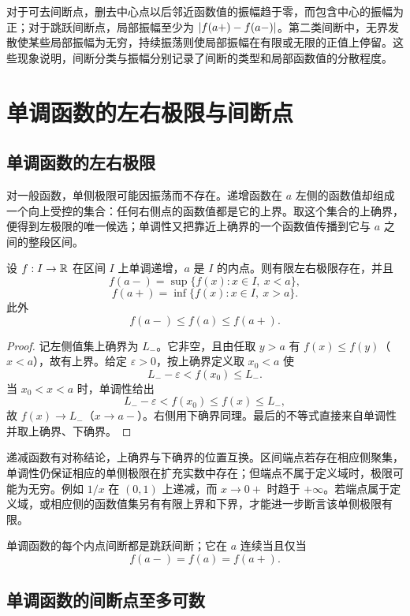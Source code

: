 对于可去间断点，删去中心点以后邻近函数值的振幅趋于零，而包含中心的振幅为正；对于跳跃间断点，局部振幅至少为
\(\left|f(a+)-f(a-)\right|\)。第二类间断中，无界发散使某些局部振幅为无穷，持续振荡则使局部振幅在有限或无限的正值上停留。这些现象说明，间断分类与振幅分别记录了间断的类型和局部函数值的分散程度。

\section{单调函数的左右极限与间断点}

\subsection{单调函数的左右极限}

对一般函数，单侧极限可能因振荡而不存在。递增函数在 \(a\) 左侧的函数值却组成一个向上受控的集合：任何右侧点的函数值都是它的上界。取这个集合的上确界，便得到左极限的唯一候选；单调性又把靠近上确界的一个函数值传播到它与 \(a\) 之间的整段区间。


\begin{theorem}[单调函数的单侧极限]
设 \(f:I\to\mathbb{R}\) 在区间 \(I\) 上单调递增，\(a\) 是 \(I\) 的内点。则有限左右极限存在，并且
\[
 f(a-)=\sup\{f(x):x\in I,\ x<a\},
\]
\[
 f(a+)=\inf\{f(x):x\in I,\ x>a\}.
\]
此外
\[
 f(a-)\le f(a)\le f(a+).
\]
\end{theorem}

\begin{proof}
记左侧值集上确界为 \(L_-\)。它非空，且由任取 \(y>a\) 有 \(f(x)\le f(y)\)（\(x<a\)），故有上界。给定 \(\varepsilon>0\)，按上确界定义取 \(x_0<a\) 使
\[
 L_--\varepsilon<f(x_0)\le L_-.
\]
当 \(x_0<x<a\) 时，单调性给出
\[
 L_--\varepsilon<f(x_0)\le f(x)\le L_-,
\]
故 \(f(x)\to L_-\)（\(x\to a-\)）。右侧用下确界同理。最后的不等式直接来自单调性并取上确界、下确界。
\end{proof}

递减函数有对称结论，上确界与下确界的位置互换。区间端点若存在相应侧聚集，单调性仍保证相应的单侧极限在扩充实数中存在；但端点不属于定义域时，极限可能为无穷。例如 \(1/x\) 在 \((0,1)\) 上递减，而 \(x\to0+\) 时趋于 \(+\infty\)。若端点属于定义域，或相应侧的函数值集另有有限上界和下界，才能进一步断言该单侧极限有限。

\begin{corollary}
单调函数的每个内点间断都是跳跃间断；它在 \(a\) 连续当且仅当
\[
 f(a-)=f(a)=f(a+).
\]
\end{corollary}

\subsection{单调函数的间断点至多可数}


